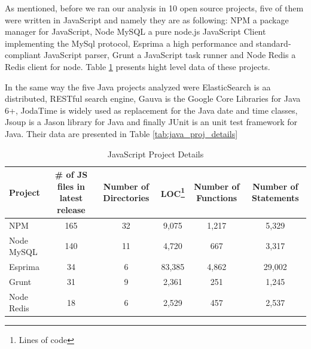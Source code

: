 As mentioned, before we ran our analysis in 10 open source projects, five of them were written in JavaScript and namely they are as following: NPM a package manager for JavaScript, Node MySQL a pure node.js JavaScript Client implementing the MySql protocol, Esprima a high performance and standard-compliant JavaScript parser, Grunt a JavaScript task runner and Node Redis a Redis client for node. Table \ref{tab:java_script_proj_details} presents hight level data of these projects.

In the same way the five Java projects analyzed were ElasticSearch is aa distributed, RESTful search engine, Gauva is the Google Core Libraries for Java 6+, JodaTime is widely used as replacement for the Java date and time classes, Jsoup is a Jason library for Java and finally JUnit is an unit test framework for Java. Their data are presented in Table \ref{tab:java_proj_details}     

\begin{table}[!tbh]
	\begin{center}
		\caption{JavaScript Project Details }
		\label{tab:java_script_proj_details}
		\begin{tabular}{l| c c c c c}
			\toprule
			\textbf{Project} & \textbf{\# of JS files in latest release} & \textbf{Number of Directories} & \textbf{LOC\footnote{Lines of code}} & \textbf{Number of Functions} & \textbf{Number of Statements} \\ 
			\midrule
			NPM              & 165                                       & 32                             & 9,075                                & 1,217                        & 5,329                         \\
			Node MySQL       & 140                                       & 11                             & 4,720                                & 667                          & 3,317                         \\
			Esprima          & 34                                        & 6                              & 83,385                               & 4,862                        & 29,002                        \\
			Grunt            & 31                                        & 9                              & 2,361                                & 251                          & 1,245                         \\
			Node Redis       & 18                                        & 6                              & 2,529                                & 457                          & 2,537                         \\ 
			\bottomrule
		\end{tabular}
	\end{center}
\end{table}

